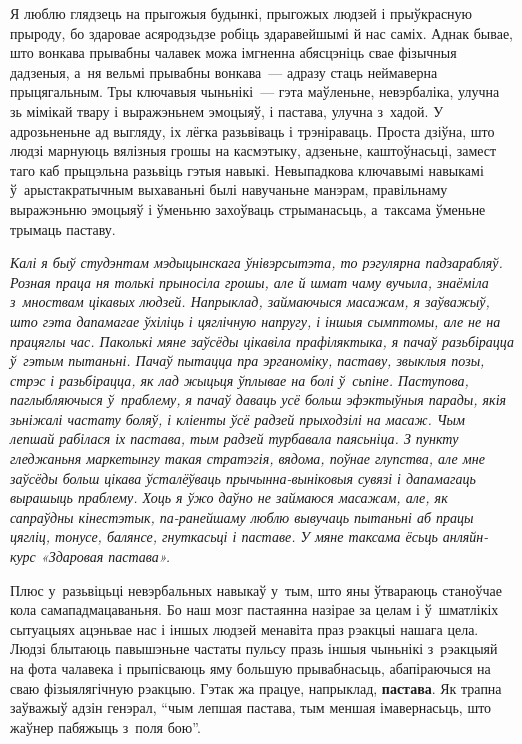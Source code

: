 Я люблю глядзець на прыгожыя будынкі, прыгожых людзей і прыўкрасную прыроду, бо здаровае асяродзьдзе робіць здаравейшымі й нас саміх. Аднак бывае, што вонкава прывабны чалавек можа імгненна абясцэніць свае фізычныя дадзеныя, а~ня вельмі прывабны вонкава~--- адразу стаць неймаверна прыцягальным. Тры ключавыя чыньнікі~--- гэта маўленьне, невэрбаліка, улучна зь мімікай твару і выражэньнем эмоцыяў, і пастава, улучна з~хадой. У адрозьненьне ад выгляду, іх лёгка разьвіваць і трэніраваць. Проста дзіўна, што людзі марнуюць вялізныя грошы на касмэтыку, адзеньне, каштоўнасьці, замест таго каб прыцэльна разьвіць гэтыя навыкі. Невыпадкова ключавымі навыкамі ў~арыстакратычным выхаваньні былі навучаньне манэрам, правільнаму выражэньню эмоцыяў і ўменьню захоўваць стрыманасьць, а~таксама ўменьне трымаць паставу.

\emph{Калі я быў студэнтам мэдыцынскага ўнівэрсытэта, то рэгулярна падзарабляў. Розная праца ня толькі прыносіла грошы, але й шмат чаму вучыла, знаёміла з~мноствам цікавых людзей. Напрыклад, займаючыся масажам, я заўважыў, што гэта дапамагае ўхіліць і цяглічную напругу, і іншыя сымптомы, але не на працяглы час. Паколькі мяне заўсёды цікавіла прафіляктыка, я пачаў разьбірацца ў~гэтым пытаньні. Пачаў пытацца пра эрганоміку, паставу, звыклыя позы, стрэс і разьбірацца, як лад жыцьця ўплывае на болі ў~сьпіне. Паступова, паглыбляючыся ў~праблему, я пачаў даваць усё больш эфэктыўныя парады, якія зьніжалі частату боляў, і кліенты ўсё радзей прыходзілі на масаж. Чым лепшай рабілася іх пастава, тым радзей турбавала паясьніца. З пункту гледжаньня маркетынгу такая стратэгія, вядома, поўнае глупства, але мне заўсёды больш цікава ўсталёўваць прычынна-выніковыя сувязі і дапамагаць вырашыць праблему. Хоць я ўжо даўно не займаюся масажам, але, як сапраўдны кінестэтык, па-ранейшаму люблю вывучаць пытаньні аб працы цягліц, тонусе, балянсе, гнуткасьці і паставе. У мяне таксама ёсьць анляйн-курс «Здаровая пастава».}

Плюс у~разьвіцьці невэрбальных навыкаў у~тым, што яны ўтвараюць станоўчае кола самападмацаваньня. Бо наш мозг пастаянна назірае за целам і ў~шматлікіх сытуацыях ацэньвае нас і іншых людзей менавіта праз рэакцыі нашага цела. Людзі блытаюць павышэньне частаты пульсу празь іншыя чыньнікі з~рэакцыяй на фота чалавека і прыпісваюць яму большую прывабнасьць, абапіраючыся на сваю фізыялягічную рэакцыю. Гэтак жа працуе, напрыклад, \textbf{пастава}. Як трапна заўважыў адзін генэрал, ``чым лепшая пастава, тым меншая імавернасьць, што жаўнер пабяжыць з~поля бою''.

